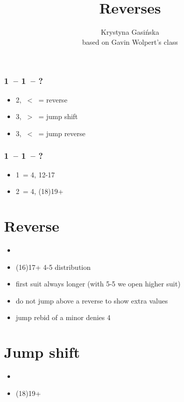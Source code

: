 \documentclass[12pt, a4paper]{article}
\title{Reverses}
\author{Krystyna Gasińska\\\small{based on Gavin Wolpert's class}}
\begin{document}
\maketitle


\subsubsection*{1\ -- 1\ -- ?}
\begin{itemize}
    \item 2, \ < \ = reverse
    \item 3, \ > \ = jump shift
    \item 3, \ < \ = jump reverse
\end{itemize}

\subsubsection*{1\mins\ -- 1\hearts\ -- ?}
\begin{itemize}
    \item 1\spades\ = 4\spades, 12-17
    \item 2\spades\ = 4\spades, (18)19+
\end{itemize}


\section{Reverse}
\begin{itemize}
    \item \fonce
    \item (16)17+ 4-5 distribution
    \item first suit always longer (with 5-5 we open higher suit)
    \item do not jump above a reverse to show extra values
    \item jump rebid of a minor denies 4\major\ \vimp
\end{itemize}

\section{Jump shift}
\begin{itemize}
    \item \gf
    \item (18)19+
\end{itemize}
\end{document}
